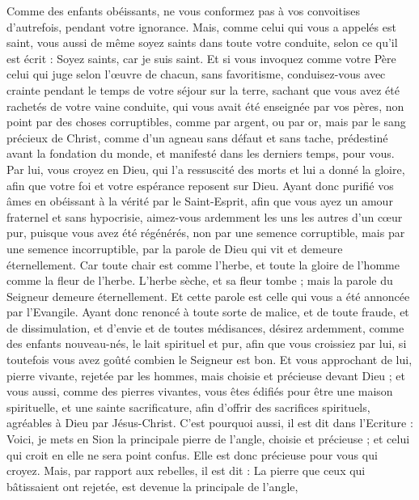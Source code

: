 \begin{multicols}{2}
Comme des enfants obéissants, ne vous conformez pas à vos convoitises d'autrefois, pendant votre ignorance. 
Mais, comme celui qui vous a appelés est saint, vous aussi de même soyez saints dans toute votre conduite,
selon ce qu'il est écrit : Soyez saints, car je suis saint.
Et si vous invoquez comme votre Père celui qui juge selon l'œuvre de chacun, sans favoritisme, conduisez-vous avec crainte pendant le temps de votre séjour sur la terre,
sachant que vous avez été rachetés de votre vaine conduite, qui vous avait été enseignée par vos pères, non point par des choses corruptibles, comme par argent, ou par or,
mais par le sang précieux de Christ, comme d'un agneau sans défaut et sans tache,
prédestiné avant la fondation du monde, et manifesté dans les derniers temps, pour vous.
Par lui, vous croyez en Dieu, qui l'a ressuscité des morts et lui a donné la gloire, afin que votre foi et votre espérance reposent sur Dieu.
Ayant donc purifié vos âmes en obéissant à la vérité par le Saint-Esprit, afin que vous ayez un amour fraternel et sans hypocrisie, aimez-vous ardemment les uns les autres d'un cœur pur,
puisque vous avez été régénérés, non par une semence corruptible, mais par une semence incorruptible, par la parole de Dieu qui vit et demeure éternellement.
Car toute chair est comme l'herbe, et toute la gloire de l'homme comme la fleur de l'herbe. L'herbe sèche, et sa fleur tombe ;
mais la parole du Seigneur demeure éternellement. Et cette parole est celle qui vous a été annoncée par l'Evangile.
\VerseOne{}Ayant donc renoncé à toute sorte de malice, et de toute fraude, et de dissimulation, et d'envie et de toutes médisances,
désirez ardemment, comme des enfants nouveau-nés, le lait spirituel et pur, afin que vous croissiez par lui,
si toutefois vous avez goûté combien le Seigneur est bon.
Et vous approchant de lui, pierre vivante, rejetée par les hommes, mais choisie et précieuse devant Dieu ;
et vous aussi, comme des pierres vivantes, vous êtes édifiés pour être une maison spirituelle, et une sainte sacrificature, afin d'offrir des sacrifices spirituels, agréables à Dieu par Jésus-Christ. 
C'est pourquoi aussi, il est dit dans l'Ecriture : Voici, je mets en Sion la principale pierre de l'angle, choisie et précieuse ; et celui qui croit en elle ne sera point confus.
Elle est donc précieuse pour vous qui croyez. Mais, par rapport aux rebelles, il est dit : La pierre que ceux qui bâtissaient ont rejetée, est devenue la principale de l'angle, 

\end{multicols}
